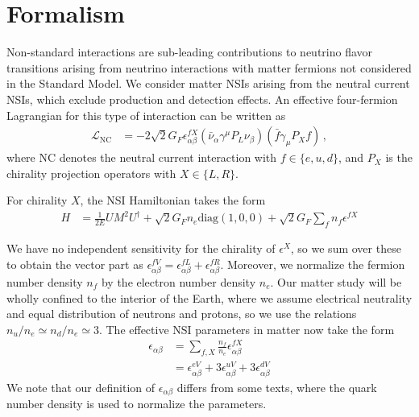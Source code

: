 \documentclass[draft=True]{revtex4-2}
\begin{document}
\section{Formalism}
Non-standard interactions are sub-leading contributions to neutrino flavor transitions arising from neutrino interactions with 
matter fermions not considered in the Standard Model. We consider matter NSIs arising from the neutral current NSIs, which exclude production 
and detection effects. An effective four-fermion Lagrangian for this type of interaction can be written as
\begin{align}
   \mathcal{L}_{\mathrm{NC}} &= -2 \sqrt{2} G_{F} \epsilon_{\alpha \beta}^{f X}\left(\bar{\nu}_{\alpha} \gamma^{\mu} P_{L} \nu_{\beta}\right)\left(\bar{f} \gamma_{\mu} P_{X} f\right)\,,
\end{align}
where NC denotes the neutral current interaction with 
$f \in \{e,u,d\}$, and $P_X$ is the chirality projection operators with $X \in \{L,R\}$.  

For chirality $X$, the NSI Hamiltonian takes the form 
\begin{align}
   H &= \frac{1}{2E} UM^2U^\dagger + \sqrt{2}G_F n_e \text{diag}(1,0,0) + \sqrt{2}G_F \sum_f n_f \epsilon^{fX}
\end{align}

We have no independent sensitivity for the chirality of $\epsilon^X$, so we sum over these to obtain the vector part as $\epsilon^{fV}_{\alpha\beta} = \epsilon^{fL}_{\alpha\beta}+ \epsilon^{fR}_{\alpha\beta}$.
Moreover, we normalize the fermion number density $n_f$ by
the electron number density $n_e$. Our matter study will be wholly confined to the interior of the Earth, where we assume electrical neutrality and equal distribution of neutrons and protons, 
so we use the relations $n_u/n_e \simeq n_d/n_e \simeq 3$.
The effective NSI parameters in matter now take the form
\begin{align} \label{eq:epsilon}
    \epsilon_{\alpha\beta} &= \sum_{f,X} \frac{n_f}{n_e} \epsilon^{fX}_{\alpha\beta} \nonumber \\
                           &= \epsilon_{\alpha\beta}^{eV} + 3\epsilon_{\alpha\beta}^{uV} + 3\epsilon_{\alpha\beta}^{dV}
\end{align}
We note that our definition of $\epsilon_{\alpha\beta}$ differs from some texts, where the quark number density is used to normalize
the parameters\cite{deepcoreNSI}.
\end{document}
